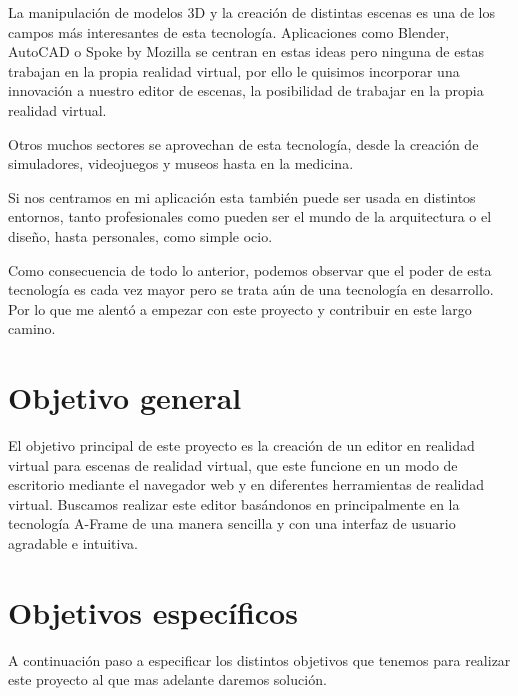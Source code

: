 \documentclass[a4paper, 12pt]{book}
\begin{document}
La manipulación de modelos 3D y la creación de distintas escenas es una de los campos más interesantes de esta tecnología. Aplicaciones como Blender, AutoCAD o Spoke by Mozilla se centran en estas ideas pero ninguna de estas trabajan en la propia realidad virtual, por ello le quisimos incorporar una innovación a nuestro editor de escenas, la posibilidad de trabajar en la propia realidad virtual.

Otros muchos sectores se aprovechan de esta tecnología, desde la creación de  simuladores, videojuegos y museos hasta en la medicina.

Si nos centramos en mi aplicación esta también puede ser usada en distintos entornos, tanto profesionales como pueden ser el mundo de la arquitectura o el diseño, hasta personales, como simple ocio.

Como consecuencia de todo lo anterior, podemos observar que el poder de esta tecnología es cada vez mayor pero se trata aún de una tecnología en desarrollo. Por lo que me alentó a empezar con este proyecto y contribuir en este largo camino.

\section{Objetivo general}
\label{sec:objetivo general}

El objetivo principal de este proyecto es la creación de un editor en realidad virtual para escenas de realidad virtual, que este funcione en un modo de escritorio mediante el navegador web y en diferentes herramientas de realidad virtual. Buscamos realizar este editor basándonos en principalmente en la tecnología A-Frame de una manera sencilla y con una interfaz de usuario agradable e intuitiva.

\section{Objetivos específicos}
\label{sec:Objetivos específicos}

A continuación paso a especificar los distintos objetivos que tenemos para realizar este proyecto al que mas adelante daremos solución. 
\end{document}
